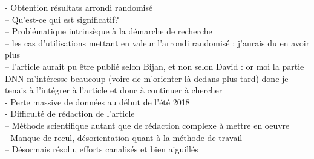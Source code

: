 \documentclass[a4paper,11pt]{article}
\begin{document}

- Obtention résultats arrondi randomisé\\
-- Qu’est-ce qui est significatif? \\
-- Problématique intrinsèque à la démarche de recherche\\
-- les cas d’utilisations mettant en valeur l’arrondi randomisé : j’aurais du en avoir plus\\
-- l’article aurait pu être publié selon Bijan, et non selon David : or moi la partie DNN m’intéresse beaucoup (voire de m’orienter là dedans plus tard) donc je tenais à l’intégrer à l’article et donc à continuer à chercher\\
- Perte massive de données au début de l’été 2018\\
- Difficulté de rédaction de l’article\\
-- Méthode scientifique autant que de rédaction complexe à mettre en oeuvre\\
- Manque de recul, désorientation quant à la méthode de travail\\
-- Désormais résolu, efforts canalisés et bien aiguillés\\


{}

\end{document}
